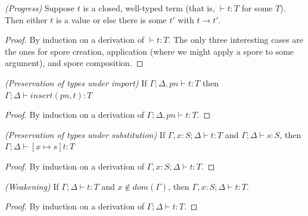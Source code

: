 \documentclass[runningheads]{llncs}
\newcommand{\seq}[1]{\overline{#1}}
\begin{document}
\begin{sloppypar}



\begin{theorem}
\emph{(Progress)}
\label{th:progress}
Suppose $t$ is a closed, well-typed term (that is, $\vdash t : T$ for some $T$). Then either $t$ is a value or else there is some $t'$ with $t \rightarrow t'$.
\vspace{-2.5mm}
\end{theorem}
\begin{proof}
By induction on a derivation of $\vdash t : T$. The only three interesting cases are the ones for spore creation, application (where we might apply a spore to some argument), and spore composition.
\end{proof}


\begin{lemma}
\emph{(Preservation of types under import)}
\label{lem:pres-import}
If $\Gamma ; \Delta, pn \vdash t : T$ then $\Gamma ; \Delta \vdash insert(pn, t) : T$
\vspace{-2.5mm}
\end{lemma}
\begin{proof}
By induction on a derivation of $\Gamma ; \Delta, pn \vdash t : T$.
\end{proof}


\begin{lemma}
\emph{(Preservation of types under substitution)}
\label{lem:substitution}
If $\Gamma, x : S ; \Delta \vdash t : T$ and $\Gamma ; \Delta \vdash s : S$, then $\Gamma ; \Delta \vdash [x \mapsto s]t : T$
\vspace{-2.5mm}
\end{lemma}
\begin{proof}
By induction on a derivation of $\Gamma, x : S ; \Delta \vdash t : T$.
\end{proof}


\begin{lemma}
\emph{(Weakening)}
\label{lem:weak}
If $\Gamma ; \Delta \vdash t : T$ and $x \notin dom(\Gamma)$, then $\Gamma, x : S ; \Delta \vdash t : T$.
\vspace{-2.5mm}
\end{lemma}
\begin{proof}
By induction on a derivation of $\Gamma ; \Delta \vdash t : T$.
\end{proof}



\end{sloppypar}
\end{document}
